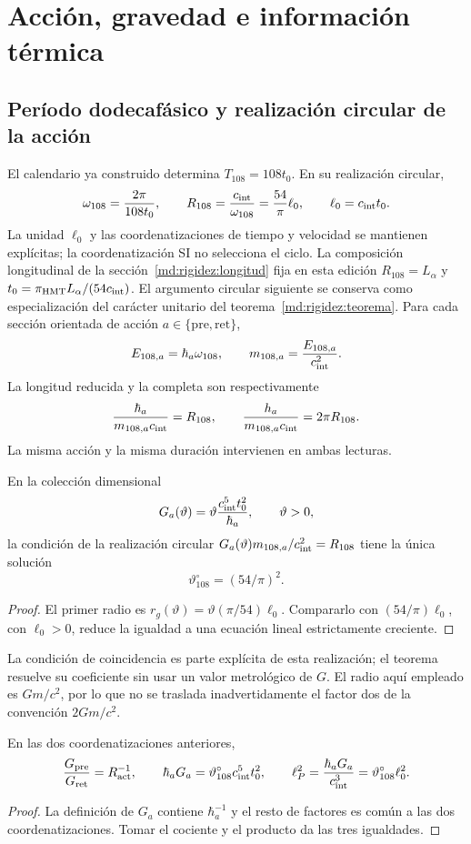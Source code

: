 \section{Acción, gravedad e información térmica}
\label{sec:gravity}
\subsection{Período dodecafásico y realización circular de la acción}
El calendario ya construido determina $T_{108}=108t_0$.
En su realización circular,
\[
\omega_{108}=\frac{2\pi}{108t_0},\qquad
R_{108}=\frac{c_{\rm int}}{\omega_{108}}
=\frac{54}{\pi}\ell_0,\qquad \ell_0=c_{\rm int}t_0.
\]
La unidad $\ell_0$ y las coordenatizaciones de tiempo y velocidad se mantienen
explícitas; la coordenatización SI no selecciona el ciclo.
La composición longitudinal de la sección~\ref{md:rigidez:longitud}
fija en esta edición $R_{108}=L_\alpha$ y
$t_0=\pi_{\rm HMT}L_\alpha/(54c_{\rm int})$.
El argumento circular siguiente se conserva como especialización
del carácter unitario del teorema~\ref{md:rigidez:teorema}.
Para cada sección orientada de acción $a\in\{\mathrm{pre},\mathrm{ret}\}$,
\[
E_{108,a}=\hbar_a\omega_{108},\qquad
m_{108,a}=\frac{E_{108,a}}{c_{\rm int}^2}.
\]
La longitud reducida y la completa son respectivamente
\[
\frac{\hbar_a}{m_{108,a}c_{\rm int}}=R_{108},
\qquad
\frac{h_a}{m_{108,a}c_{\rm int}}=2\pi R_{108}.
\]
La misma acción y la misma duración intervienen en ambas lecturas.

\begin{proposition}
En la colección dimensional
\[
G_a(\vartheta)=\vartheta\frac{c_{\rm int}^5t_0^2}{\hbar_a},
\qquad \vartheta>0,
\]
la condición de la realización circular
$G_a(\vartheta)m_{108,a}/c_{\rm int}^2=R_{108}$
tiene la única solución
\[
\vartheta^\circ_{108}=(54/\pi)^2.
\]
\end{proposition}
\begin{proof}
El primer radio es
$r_g(\vartheta)=\vartheta(\pi/54)\ell_0$.
Compararlo con $(54/\pi)\ell_0$, con $\ell_0>0$, reduce la
igualdad a una ecuación lineal estrictamente creciente.
\end{proof}
La condición de coincidencia es parte explícita de esta realización;
el teorema resuelve su coeficiente sin usar un valor metrológico de $G$.
El radio aquí empleado es $Gm/c^2$, por lo que no se traslada
inadvertidamente el factor dos de la convención $2Gm/c^2$.

\begin{proposition}
En las dos coordenatizaciones anteriores,
\[
\frac{G_{\rm pre}}{G_{\rm ret}}=R_{\rm act}^{-1},\qquad
\hbar_aG_a=\vartheta^\circ_{108}c_{\rm int}^5t_0^2,
\qquad
\ell_P^2=\frac{\hbar_aG_a}{c_{\rm int}^3}
=\vartheta^\circ_{108}\ell_0^2.
\]
\end{proposition}
\begin{proof}
La definición de $G_a$ contiene $\hbar_a^{-1}$ y el resto de factores
es común a las dos coordenatizaciones. Tomar el cociente y el producto da
las tres igualdades.
\end{proof}
